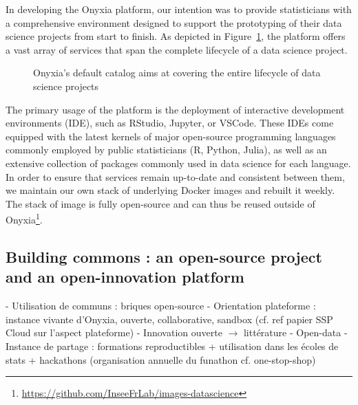 In developing the Onyxia platform, our intention was to provide statisticians with a comprehensive environment designed to support the prototyping of their data science projects from start to finish. As depicted in Figure~\ref{fig:onyxia-catalog}, the platform offers a vast array of services that span the complete lifecycle of a data science project.

\begin{figure}[htbp]
    \centering
    \caption{Onyxia's default catalog aims at covering the entire lifecycle of data science projects}
    \label{fig:onyxia-catalog}
\end{figure}

The primary usage of the platform is the deployment of interactive development environments (IDE), such as RStudio, Jupyter, or VSCode. These IDEs come equipped with the latest kernels of major open-source programming languages commonly employed by public statisticians (R, Python, Julia), as well as an extensive collection of packages commonly used in data science for each language. In order to ensure that services remain up-to-date and consistent between them, we maintain our own stack of underlying Docker images and rebuilt it weekly. The stack of image is fully open-source and can thus be reused outside of Onyxia\footnote{\url{https://github.com/InseeFrLab/images-datascience}}.



\subsection{Building commons : an open-source project and an open-innovation platform}

- Utilisation de communs : briques open-source
- Orientation plateforme : instance vivante d'Onyxia, ouverte, collaborative, sandbox (cf. ref papier SSP Cloud sur l'aspect plateforme)
- Innovation ouverte $\rightarrow$ littérature
- Open-data
- Instance de partage : formations reproductibles + utilisation dans les écoles de stats + hackathons (organisation annuelle du funathon cf. one-stop-shop)
